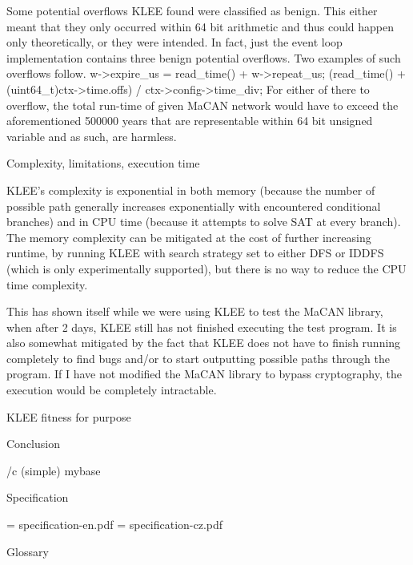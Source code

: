 Some potential overflows KLEE found were classified as benign. This either
meant that they only occurred within 64 bit arithmetic and thus could happen
only theoretically, or they were intended. In fact, just the event loop
implementation contains three benign potential overflows. Two examples of such
overflows follow.
\begtt
w->expire_us = read_time() + w->repeat_us;
\endtt
\begtt
(read_time() + (uint64_t)ctx->time.offs) / ctx->config->time_div;
\endtt
For either of there to overflow, the total run-time of given MaCAN network
would have to exceed the aforementioned 500000 years that are representable
within 64 bit unsigned variable and as such, are harmless.

\sec Complexity, limitations, execution time

KLEE's complexity is exponential in both memory (because the number of possible
path generally increases exponentially with encountered conditional branches)
and in CPU time (because it attempts to solve SAT at every branch). The memory
complexity can be mitigated at the cost of further increasing runtime, by
running KLEE with search strategy set to either DFS or IDDFS (which is only
experimentally supported), but there is no way to reduce the CPU time
complexity.

This has shown itself while we were using KLEE to test the MaCAN library, when
after 2 days, KLEE still has not finished executing the test program. It is
also somewhat mitigated by the fact that KLEE does not have to finish running
completely to find bugs and/or to start outputting possible paths through the
program. If I have not modified the MaCAN library to bypass cryptography, the
execution would be completely intractable.

\sec KLEE fitness for purpose




\chap Conclusion



\bibchap
\usebib/c (simple) mybase


\app Specification

\picw=\hsize
\cinspic specification-en.pdf
\vfil\break
\picw=\hsize
\cinspic specification-cz.pdf
\nextoddpage


\app Glossary\par
\makeglos

\nextoddpage

\bye

